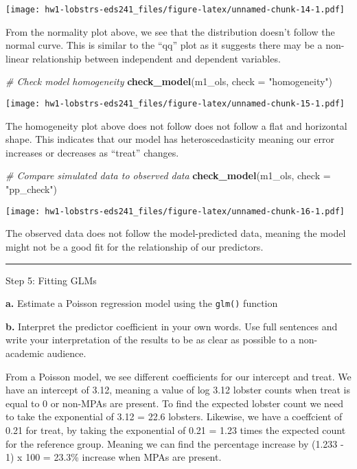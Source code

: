 \documentclass[
]{article}
\newenvironment{Shaded}{\begin{snugshade}}{\end{snugshade}}
\newcommand{\AttributeTok}[1]{\textcolor[rgb]{0.13,0.29,0.53}{#1}}
\newcommand{\CommentTok}[1]{\textcolor[rgb]{0.56,0.35,0.01}{\textit{#1}}}
\newcommand{\FunctionTok}[1]{\textcolor[rgb]{0.13,0.29,0.53}{\textbf{#1}}}
\newcommand{\NormalTok}[1]{#1}
\newcommand{\StringTok}[1]{\textcolor[rgb]{0.31,0.60,0.02}{#1}}
\begin{document}
\texttt{[image: hw1-lobstrs-eds241\_files/figure-latex/unnamed-chunk-14-1.pdf]}

From the normality plot above, we see that the distribution doesn't
follow the normal curve. This is similar to the ``qq'' plot as it
suggests there may be a non-linear relationship between independent and
dependent variables.

\begin{Shaded}
\begin{Highlighting}[]
\CommentTok{\# Check model homogeneity }
\FunctionTok{check\_model}\NormalTok{(m1\_ols, }\AttributeTok{check =} \StringTok{"homogeneity"}\NormalTok{)}
\end{Highlighting}
\end{Shaded}

\texttt{[image: hw1-lobstrs-eds241\_files/figure-latex/unnamed-chunk-15-1.pdf]}

The homogeneity plot above does not follow does not follow a flat and
horizontal shape. This indicates that our model has heteroscedasticity
meaning our error increases or decreases as ``treat'' changes.

\begin{Shaded}
\begin{Highlighting}[]
\CommentTok{\# Compare simulated data to observed data }
\FunctionTok{check\_model}\NormalTok{(m1\_ols, }\AttributeTok{check =} \StringTok{"pp\_check"}\NormalTok{)}
\end{Highlighting}
\end{Shaded}

\texttt{[image: hw1-lobstrs-eds241\_files/figure-latex/unnamed-chunk-16-1.pdf]}

The observed data does not follow the model-predicted data, meaning the
model might not be a good fit for the relationship of our predictors.

\begin{center}\rule{0.5\linewidth}{0.5pt}\end{center}

Step 5: Fitting GLMs

\textbf{a.} Estimate a Poisson regression model using the \texttt{glm()}
function

\textbf{b.} Interpret the predictor coefficient in your own words. Use
full sentences and write your interpretation of the results to be as
clear as possible to a non-academic audience.

From a Poisson model, we see different coefficients for our intercept
and treat. We have an intercept of 3.12, meaning a value of log 3.12
lobster counts when treat is equal to 0 or non-MPAs are present. To find
the expected lobster count we need to take the exponential of 3.12 =
22.6 lobsters. Likewise, we have a coeffcient of 0.21 for treat, by
taking the exponential of 0.21 = 1.23 times the expected count for the
reference group. Meaning we can find the percentage increase by (1.233 -
1) x 100 = 23.3\% increase when MPAs are present.
\end{document}
